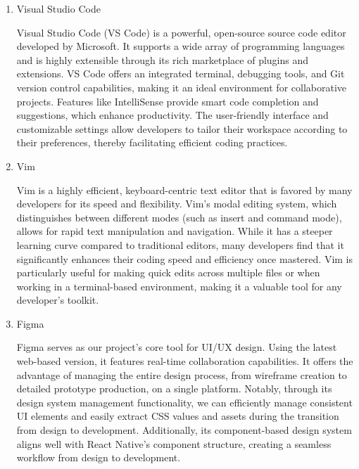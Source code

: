 \documentclass[conference]{IEEEtran}
\begin{document}
\begin{enumerate}[label=\arabic*]
    \item Visual Studio Code\par
    \vspace{0.3em}
    Visual Studio Code (VS Code) is a powerful, open-source source code editor developed by Microsoft. It supports a wide array of programming languages and is highly extensible through its rich marketplace of plugins and extensions. VS Code offers an integrated terminal, debugging tools, and Git version control capabilities, making it an ideal environment for collaborative projects. Features like IntelliSense provide smart code completion and suggestions, which enhance productivity. The user-friendly interface and customizable settings allow developers to tailor their workspace according to their preferences, thereby facilitating efficient coding practices.

    \vspace{1em}

    \item Vim\par
    \vspace{0.3em}
    Vim is a highly efficient, keyboard-centric text editor that is favored by many developers for its speed and flexibility. Vim’s modal editing system, which distinguishes between different modes (such as insert and command mode), allows for rapid text manipulation and navigation. While it has a steeper learning curve compared to traditional editors, many developers find that it significantly enhances their coding speed and efficiency once mastered. Vim is particularly useful for making quick edits across multiple files or when working in a terminal-based environment, making it a valuable tool for any developer’s toolkit.

    \vspace{1em}

    \item Figma\par
    \vspace{0.3em}
    Figma serves as our project's core tool for UI/UX design. Using the latest web-based version, it features real-time collaboration capabilities. It offers the advantage of managing the entire design process, from wireframe creation to detailed prototype production, on a single platform. Notably, through its design system management functionality, we can efficiently manage consistent UI elements and easily extract CSS values and assets during the transition from design to development. Additionally, its component-based design system aligns well with React Native's component structure, creating a seamless workflow from design to development.


\end{enumerate}
\end{document}
